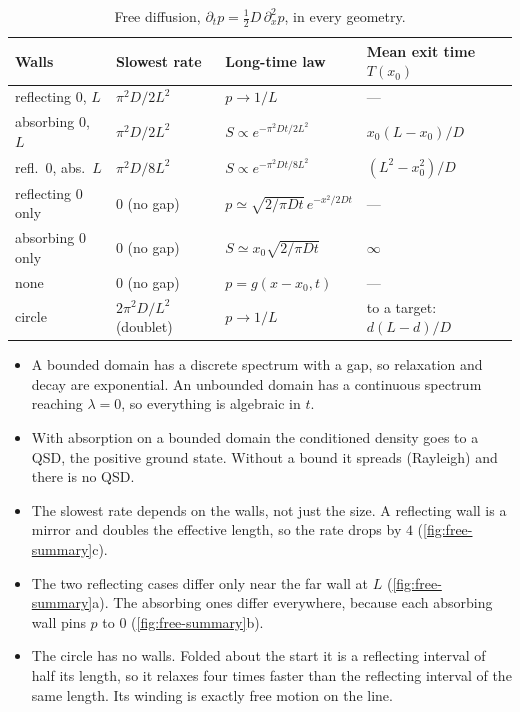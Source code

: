 \documentclass[11pt]{article}
\numberwithin{equation}{section}
\begin{document}
\begin{table}[h]
\centering
\small
\renewcommand{\arraystretch}{1.3}
\begin{tabular}{@{}l l l l@{}}
\toprule
Walls & Slowest rate & Long-time law & Mean exit time $T(x_0)$ \\
\midrule
reflecting $0$, $L$   & $\pi^2D/2L^2$ & $p\to1/L$                               & --- \\
absorbing $0$, $L$    & $\pi^2D/2L^2$ & $S\propto e^{-\pi^2Dt/2L^2}$            & $x_0(L-x_0)/D$ \\
refl.\ $0$, abs.\ $L$ & $\pi^2D/8L^2$ & $S\propto e^{-\pi^2Dt/8L^2}$            & $(L^2-x_0^2)/D$ \\
reflecting $0$ only   & $0$ (no gap)  & $p\simeq\sqrt{2/\pi Dt}\,e^{-x^2/2Dt}$  & --- \\
absorbing $0$ only    & $0$ (no gap)  & $S\simeq x_0\sqrt{2/\pi Dt}$           & $\infty$ \\
none                  & $0$ (no gap)  & $p=g(x-x_0,t)$                          & --- \\
circle                & $2\pi^2D/L^2$ (doublet) & $p\to1/L$                     & to a target: $d(L-d)/D$ \\
\bottomrule
\end{tabular}
\caption{Free diffusion, $\partial_tp=\tfrac12D\,\partial_x^2p$, in every geometry.}
\label{tab:free-summary}
\end{table}

\begin{itemize}
  \item A bounded domain has a discrete spectrum with a gap, so relaxation and decay are exponential. An
        unbounded domain has a continuous spectrum reaching $\lambda=0$, so everything is algebraic in $t$.
  \item With absorption on a bounded domain the conditioned density goes to a QSD, the positive ground state.
        Without a bound it spreads (Rayleigh) and there is no QSD.
  \item The slowest rate depends on the walls, not just the size. A reflecting wall is a mirror and doubles
        the effective length, so the rate drops by $4$ (\cref{fig:free-summary}c).
  \item The two reflecting cases differ only near the far wall at $L$ (\cref{fig:free-summary}a). The
        absorbing ones differ everywhere, because each absorbing wall pins $p$ to $0$
        (\cref{fig:free-summary}b).
  \item The circle has no walls. Folded about the start it is a reflecting interval of half its length, so it
        relaxes four times faster than the reflecting interval of the same length. Its winding is exactly
        free motion on the line.
\end{itemize}
\end{document}
